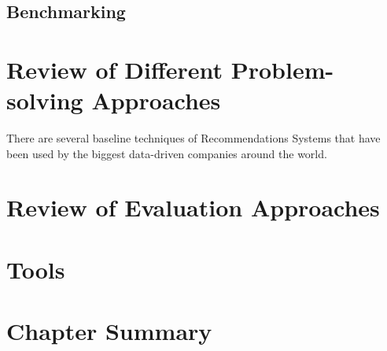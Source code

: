
\subsection{Benchmarking}

\section{Review of Different Problem-solving Approaches}
There are several baseline techniques of Recommendations Systems that have been used by the biggest data-driven companies around the world.

\section{Review of Evaluation Approaches}

\section{Tools}

\section{Chapter Summary}
